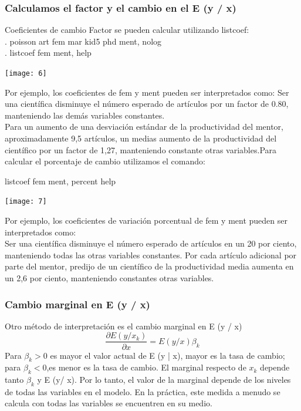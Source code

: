 \documentclass[11pt,fleqn]{book} %
\numberwithin{equation}{section} %
\numberwithin{figure}{section} %
\numberwithin{table}{section} %
\begin{document}
\subsubsection{Calculamos el factor y el cambio en el E (y / x)}
Coeficientes de cambio Factor se pueden calcular utilizando listcoef:\\
. poisson art fem mar kid5 phd ment, nolog\\
. listcoef fem ment, help\\

\begin{center}
\texttt{[image: 6]}
\end{center}

Por ejemplo, los coeficientes de fem y ment pueden ser interpretados como: Ser una científica disminuye el número esperado de artículos por un factor de 0.80, manteniendo  las demás variables constantes.
\\
Para un aumento de una desviación estándar de la productividad del mentor, aproximadamente 9,5 artículos, un medias aumento de la productividad del científico por un factor de 1,27, manteniendo constante otras variables.Para calcular el porcentaje de cambio utilizamos el comando:

listcoef fem ment, percent help\\

\begin{center}
\texttt{[image: 7]}
\end{center}

Por ejemplo, los coeficientes de variación porcentual de fem y ment pueden ser interpretados como:\\
Ser una científica disminuye el número esperado de artículos en un 20 por ciento, manteniendo todas las otras variables constantes. Por cada artículo adicional por parte del mentor, predijo de un científico de la productividad media aumenta en un 2,6 por ciento, manteniendo constantes otras variables.
\subsubsection{Cambio marginal en E (y / x)}
Otro método de interpretación es el cambio marginal en  E (y / x)
\begin{equation}
\frac{\partial E (y /  x_{k})}{\partial  x}=E (y / x)\beta_{k}
\end{equation}
Para $\beta_{k}> 0$ es  mayor  el valor actual de E (y | x), mayor es la tasa de cambio; para $\beta_{k} <0$,es menor es la tasa de cambio. El marginal respecto de $x_{k}$ depende tanto $\beta_{k}$ y E (y/ x).
Por lo tanto, el valor de la marginal depende de los niveles de todas las variables en el modelo. En la práctica, este medida a menudo se calcula con todas las variables se encuentren en su medio.
\end{document}
